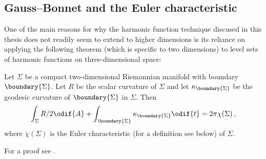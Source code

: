 \documentclass[titlepage,numbers=noenddot,oneside,%
cleardoublepage=empty,paper=a4,fontsize=11pt,%
english,%
]{scrartcl}
\newcommand*{\mathcomma}{\,,}
\begin{document}
\subsection{Gauss--Bonnet and the Euler characteristic}
One of the main reasons for why the harmonic function technique discused in this thesis does not readily seem to extend to higher dimensions is its reliance on applying the following theorem (which is specific to two dimensions) to level sets of harmonic functions on three-dimensional space:
\begin{theorem}\label{thm:gauss_bonnet}
    Let \( \Sigma \) be a compact two-dimensional Riemannian manifold with boundary \( \boundary{\Sigma} \). Let \( R \) be the scalar curvature of \( \Sigma \) and let \( \kappa_{\boundary{\Sigma}} \) be the geodesic curvature of \( \boundary{\Sigma} \) in \( \Sigma \). Then
   \begin{equation*}
    \int_\Sigma R/2 \odif{A}+\int_{\boundary{\Sigma}}\kappa_{\boundary{\Sigma}}\odif{t}=2\pi \chi(\Sigma)\mathcomma
   \end{equation*} 
   where \( \chi(\Sigma) \) is the Euler characteristic (for a definition see below) of \( \Sigma \).
\end{theorem}
For a proof see \cite[Chapter 4.3]{petersenRiemannianGeometry2006}. 
\end{document}
